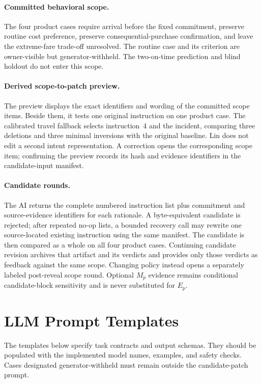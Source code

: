 \paragraph{Committed behavioral scope.}
The four product cases require arrival before the fixed commitment, preserve routine cost preference, preserve consequential-purchase confirmation, and leave the extreme-fare trade-off unresolved. The routine case and its criterion are owner-visible but generator-withheld. The two-on-time prediction and blind holdout do not enter this scope.

\paragraph{Derived scope-to-patch preview.}
The preview displays the exact identifiers and wording of the committed scope items. Beside them, it tests one original instruction on one product case. The calibrated travel fallback selects instruction~4 and the incident, comparing three deletions and three minimal inversions with the original baseline. Lin does not edit a second intent representation. A correction opens the corresponding scope item; confirming the preview records its hash and evidence identifiers in the candidate-input manifest.

\paragraph{Candidate rounds.}
The AI returns the complete numbered instruction list plus commitment and source-evidence identifiers for each rationale. A byte-equivalent candidate is rejected; after repeated no-op lists, a bounded recovery call may rewrite one source-located existing instruction using the same manifest. The candidate is then compared as a whole on all four product cases. Continuing candidate revision archives that artifact and its verdicts and provides only those verdicts as feedback against the same scope. Changing policy instead opens a separately labeled post-reveal scope round. Optional $M_p$ evidence remains conditional candidate-block sensitivity and is never substituted for $E_p$.

\section{LLM Prompt Templates}
\label{app:system-prompts}

The templates below specify task contracts and output schemas. They should be populated with the implemented model names, examples, and safety checks. Cases designated generator-withheld must remain outside the candidate-patch prompt.

